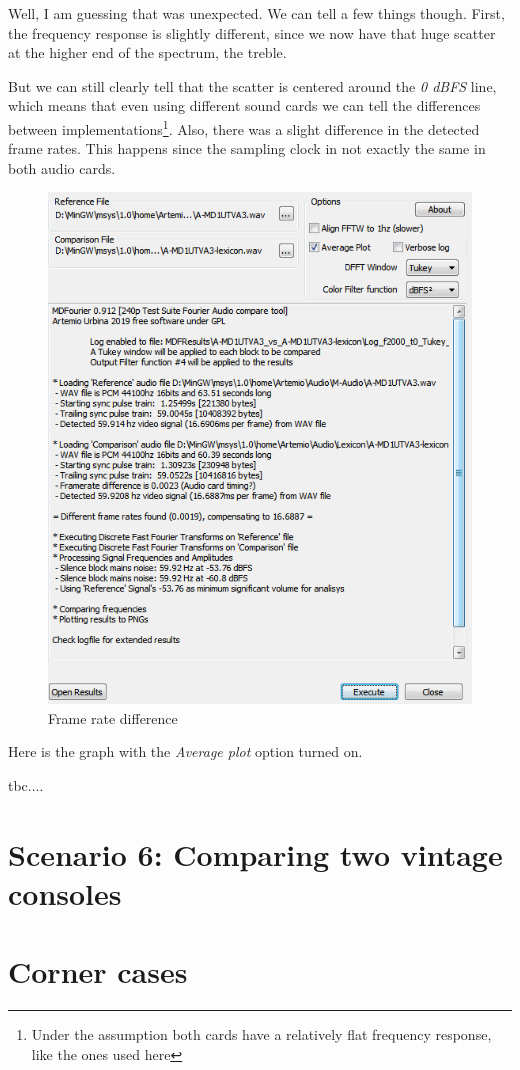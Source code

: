 \documentclass[10pt,a4paper]{report}
\begin{document}
Well, I am guessing that was unexpected. We can tell a few things though. First, the frequency response is slightly different, since we now have that huge scatter at the higher end of the spectrum, the treble.

But we can still clearly tell that the scatter is centered around the \textit{0 dBFS} line, which means that even using different sound cards we can tell the differences between implementations\footnote{Under the assumption both cards have a relatively flat frequency response, like the ones used here}. Also, there was a slight difference in the detected frame rates. This happens since the sampling clock in not exactly the same in both audio cards. 

\begin{figure}[H]
	\centering
	\includegraphics[width=0.6\linewidth]{plots/Plot5-1-FramerateDiff.png}
	\caption[Front End]{Frame rate difference}
	\label{fig:plot5-1-frameratediff}
\end{figure}

Here is the graph with the \textit{Average plot} option turned on.

tbc....

\section{Scenario 6: Comparing two vintage consoles}

\section{Corner cases}
\label{cornercase}
\end{document}
